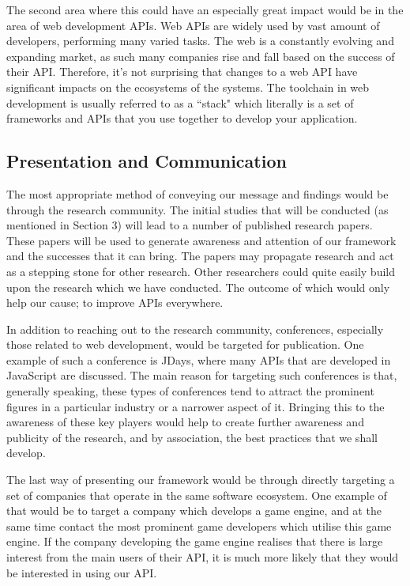 \documentclass{article}
\begin{document}
The second area where this could have an especially great impact would be in the area of web development APIs. Web APIs are widely used by vast amount of developers, performing many varied tasks. The web is a constantly evolving and expanding market, as such many companies rise and fall based on the success of their API. Therefore, it's not surprising that changes to a web API have significant impacts on the ecosystems of the systems. The toolchain in web development is usually referred to as a ``stack" which literally is a set of frameworks and APIs that you use together to develop your application.

\subsection{Presentation and Communication}
The most appropriate method of conveying our message and findings would be through the research community. The initial studies that will be conducted (as mentioned in Section 3) will lead to a number of published research papers. These papers will be used to generate awareness and attention of our framework and the successes that it can bring. The papers may propagate research and act as a stepping stone for other research. Other researchers could quite easily build upon the research which we have conducted. The outcome of which would only help our cause; to improve APIs everywhere. 

In addition to reaching out to the research community, conferences, especially those related to web development, would be targeted for publication. One example of such a conference is JDays, where many APIs that are developed in JavaScript are discussed. The main reason for targeting such conferences is that, generally speaking, these types of conferences tend to attract the prominent figures in a particular industry or a narrower aspect of it. Bringing this to the awareness of these key players would help to create further awareness and publicity of the research, and by association, the best practices that we shall develop.

The last way of presenting our framework would be through directly targeting a set of companies that operate in the same software ecosystem. One example of that would be to target a company which develops a game engine, and at the same time contact the most prominent game developers which utilise this game engine. If the company developing the game engine realises that there is large interest from the main users of their API, it is much more likely that they would be interested in using our API. 
\end{document}
